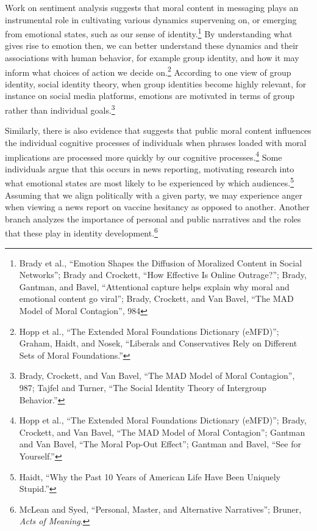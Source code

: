\documentclass[phdthesis,12pt,final]{wuthesis}
\theoremstyle{definition}
\theoremstyle{definition}
\theoremstyle{definition}
\theoremstyle{definition}
\theoremstyle{remark}
\begin{document}
Work on sentiment analysis suggests that moral content in messaging plays an instrumental role in cultivating various dynamics supervening on, or emerging from emotional states, such as our sense of identity.\footnote{Brady et al., {``Emotion Shapes the Diffusion of Moralized Content in Social Networks''}; Brady and Crockett, {``How Effective Is Online Outrage?''}; Brady, Gantman, and Bavel, {``Attentional capture helps explain why moral and emotional content go viral''}; Brady, Crockett, and Van Bavel, {``The {MAD} Model of Moral Contagion''}, 984} By understanding what gives rise to emotion then, we can better understand these dynamics and their associations with human behavior, for example group identity, and how it may inform what choices of action we decide on.\footnote{Hopp et al., {``The Extended {Moral Foundations Dictionary} ({eMFD})''}; Graham, Haidt, and Nosek, {``Liberals and Conservatives Rely on Different Sets of Moral Foundations.''}} According to one view of group identity, social identity theory, when group identities become highly relevant, for instance on social media platforms, emotions are motivated in terms of group rather than individual goals.\footnote{Brady, Crockett, and Van Bavel, {``The {MAD} Model of Moral Contagion''}, 987; Tajfel and Turner, {``The {Social Identity Theory} of {Intergroup Behavior}.''}}

Similarly, there is also evidence that suggests that public moral content influences the individual cognitive processes of individuals when phrases loaded with moral implications are processed more quickly by our cognitive processes.\footnote{Hopp et al., {``The Extended {Moral Foundations Dictionary} ({eMFD})''}; Brady, Crockett, and Van Bavel, {``The {MAD} Model of Moral Contagion''}; Gantman and Van Bavel, {``The Moral Pop-Out Effect''}; Gantman and Bavel, {``See for Yourself.''}} Some individuals argue that this occurs in news reporting, motivating research into what emotional states are most likely to be experienced by which audiences.\footnote{Haidt, {``Why the {Past} 10 {Years} of {American Life Have Been Uniquely Stupid}.''}} Assuming that we align politically with a given party, we may experience anger when viewing a news report on vaccine hesitancy as opposed to another. Another branch analyzes the importance of personal and public narratives and the roles that these play in identity development.\footnote{McLean and Syed, {``Personal, {Master}, and {Alternative Narratives}''}; Bruner, \emph{Acts of Meaning}.}
\end{document}
